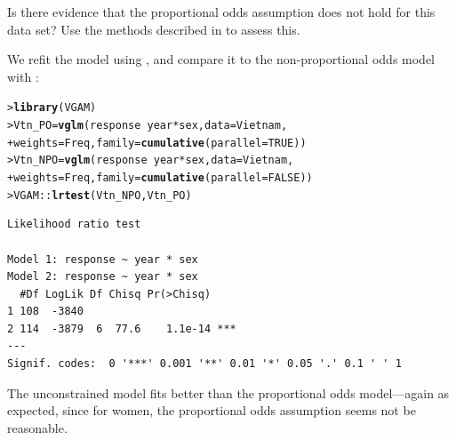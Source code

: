 \documentclass[10pt]{report}\usepackage[]{graphicx}\usepackage[]{color}
\makeatletter
\newcommand{\hlnum}[1]{\textcolor[rgb]{0.686,0.059,0.569}{#1}}%
\newcommand{\hlopt}[1]{\textcolor[rgb]{0,0,0}{#1}}%
\newcommand{\hlstd}[1]{\textcolor[rgb]{0.345,0.345,0.345}{#1}}%
\newcommand{\hlkwb}[1]{\textcolor[rgb]{0.69,0.353,0.396}{#1}}%
\newcommand{\hlkwc}[1]{\textcolor[rgb]{0.333,0.667,0.333}{#1}}%
\newcommand{\hlkwd}[1]{\textcolor[rgb]{0.737,0.353,0.396}{\textbf{#1}}}%
\newenvironment{kframe}{%
 \def\at@end@of@kframe{}%
 \ifinner\ifhmode%
  \def\at@end@of@kframe{\end{minipage}}%
  \begin{minipage}{\columnwidth}%
 \fi\fi%
 \def\FrameCommand##1{\hskip\@totalleftmargin \hskip-\fboxsep
 \colorbox{shadecolor}{##1}\hskip-\fboxsep
     \hskip-\linewidth \hskip-\@totalleftmargin \hskip\columnwidth}%
 \MakeFramed {\advance\hsize-\width
   \@totalleftmargin\z@ \linewidth\hsize
   \@setminipage}}%
 {\par\unskip\endMakeFramed%
 \at@end@of@kframe}
\newenvironment{knitrout}{}{} %
\renewenvironment{knitrout}{\small\renewcommand{\baselinestretch}{.85}}{} %
\makeatother
\begin{document}
\begin{Exercises}
\begin{enumerate*}
    \item Is there evidence that the proportional odds assumption does not hold for this data set? Use the methods
    described in  to assess this.
    \begin{ans}
    We refit the model using , and compare it to the
    non-proportional odds model with :
\begin{knitrout}\footnotesize
{}\color{fgcolor}\begin{kframe}
\begin{alltt}
\hlstd{> }\hlkwd{library}\hlstd{(VGAM)}
\hlstd{> }\hlstd{Vtn_PO} \hlkwb{=} \hlkwd{vglm}\hlstd{(response} \hlopt{~} \hlstd{year} \hlopt{*} \hlstd{sex,} \hlkwc{data} \hlstd{= Vietnam,}
\hlstd{+ }              \hlkwc{weights} \hlstd{= Freq,} \hlkwc{family} \hlstd{=} \hlkwd{cumulative}\hlstd{(}\hlkwc{parallel} \hlstd{=} \hlnum{TRUE}\hlstd{))}
\hlstd{> }\hlstd{Vtn_NPO} \hlkwb{=} \hlkwd{vglm}\hlstd{(response} \hlopt{~} \hlstd{year} \hlopt{*} \hlstd{sex,} \hlkwc{data} \hlstd{= Vietnam,}
\hlstd{+ }               \hlkwc{weights} \hlstd{= Freq,} \hlkwc{family} \hlstd{=} \hlkwd{cumulative}\hlstd{(}\hlkwc{parallel} \hlstd{=} \hlnum{FALSE}\hlstd{))}
\hlstd{> }\hlstd{VGAM}\hlopt{::}\hlkwd{lrtest}\hlstd{(Vtn_NPO, Vtn_PO)}
\end{alltt}
\begin{verbatim}
Likelihood ratio test

Model 1: response ~ year * sex
Model 2: response ~ year * sex
  #Df LogLik Df Chisq Pr(>Chisq)    
1 108  -3840                        
2 114  -3879  6  77.6    1.1e-14 ***
---
Signif. codes:  0 '***' 0.001 '**' 0.01 '*' 0.05 '.' 0.1 ' ' 1
\end{verbatim}
\end{kframe}
\end{knitrout}
    The unconstrained model fits better than the proportional odds
    model---again as expected, since for women, the proportional odds
    assumption seems not be reasonable.
    \end{ans}
    

\end{enumerate*}
\end{Exercises}
\end{document}
